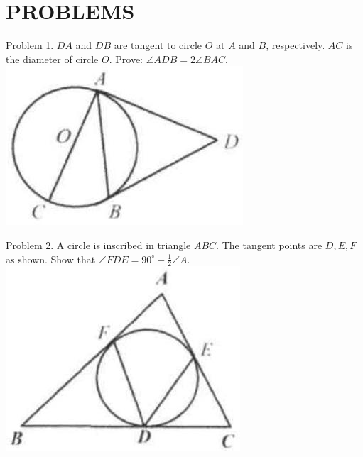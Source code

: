 \documentclass[10pt]{article}
\begin{document}
\section*{PROBLEMS}
Problem 1. \(D A\) and \(D B\) are tangent to circle \(O\) at \(A\) and \(B\), respectively. \(A C\) is the diameter of circle \(O\). Prove: \(\angle A D B=2 \angle B A C\).\\
\includegraphics[max width=\textwidth, center]{2025_04_17_97bc1f7e44d93c271a88g-206(2)}

Problem 2. A circle is inscribed in triangle \(A B C\). The tangent points are \(D, E, F\) as shown. Show that \(\angle F D E=90^{\circ}-\frac{1}{2} \angle A\).\\
\includegraphics[max width=\textwidth, center]{2025_04_17_97bc1f7e44d93c271a88g-206(3)}
\end{document}
